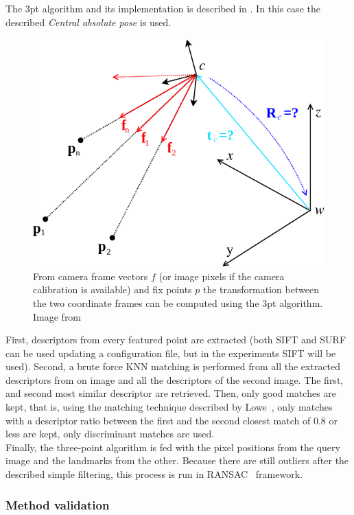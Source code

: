 The 3pt algorithm and its implementation is described in \cite{kneipopengv}. In this case the described \textit{Central absolute pose} is used.

\begin{figure}[htpb]
  \centering
  \includegraphics[width=0.6\linewidth]{img/absolute_central.png}
  \caption{From camera frame vectors $f$ (or image pixels if the camera calibration is available) and fix points $p$ the transformation between the two coordinate frames can be computed using the 3pt algorithm. Image from \cite{kneipopengv}}
  \label{fig:img/absolute_centra}
\end{figure}

First, descriptors from every featured point are extracted (both SIFT and SURF can be used updating a configuration file, but in the experiments SIFT will be used). Second, a brute force KNN matching is performed from all the extracted descriptors from on image and all the descriptors of the second image. The first, and second most similar descriptor are retrieved. Then, only good matches are kept, that is, using the matching technique described by Lowe~\cite{lowe2004distinctive}, only matches with a descriptor ratio between the first and the second closest match of 0.8 or less are kept, only discriminant matches are used.\\

Finally, the three-point algorithm is fed with the pixel positions from the query image and the landmarks from the other. Because there are still outliers after the described simple filtering, this process is run in RANSAC~\cite{fischler1981random} framework. \\


\subsubsection{Method validation}
\label{ssub:3pt_method_validation}

